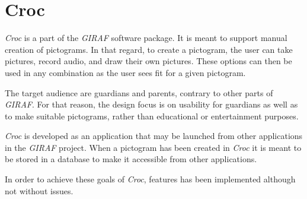 \section{Croc}
\textit{Croc} is a part of the \textit{GIRAF} software package. 
It is meant to support manual creation of pictograms.
In that regard, to create a pictogram, the user can take pictures, record audio, and draw their own pictures.
These options can then be used in any combination as the user sees fit for a given pictogram.

The target audience are guardians and parents, contrary to other parts of \textit{GIRAF}. 
For that reason, the design focus is on usability for guardians as well as to make suitable pictograms, rather than educational or entertainment purposes.

\textit{Croc} is developed as an application that may be launched from other applications in the \textit{GIRAF} project.
When a pictogram has been created in \textit{Croc} it is meant to be stored in a database to make it accessible from other applications.

In order to achieve these goals of \textit{Croc}, features has been implemented although not without issues.

